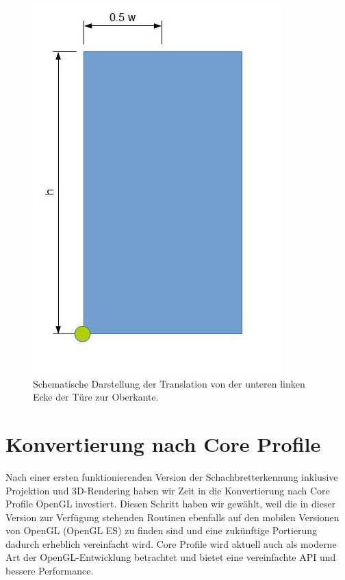 \begin{figure}[!ht]
\centering
\includegraphics[scale=0.75]{images/opengl-translation.jpg} 
\caption{Schematische Darstellung der Translation von der unteren linken Ecke der Türe zur Oberkante.}
\label{fig:opengl-perspektive}
\end{figure}


\section{Konvertierung nach Core Profile}

Nach einer ersten funktionierenden Version der Schachbretterkennung inklusive Projektion und 3D-Rendering haben wir Zeit in die Konvertierung nach Core Profile OpenGL investiert. Diesen Schritt haben wir gewählt, weil die in dieser Version zur Verfügung stehenden Routinen ebenfalls auf den mobilen Versionen von OpenGL (OpenGL ES) zu finden sind und eine zukünftige Portierung dadurch erheblich vereinfacht wird. Core Profile wird aktuell auch als moderne Art der OpenGL-Entwicklung betrachtet und bietet eine vereinfachte API und bessere Performance.